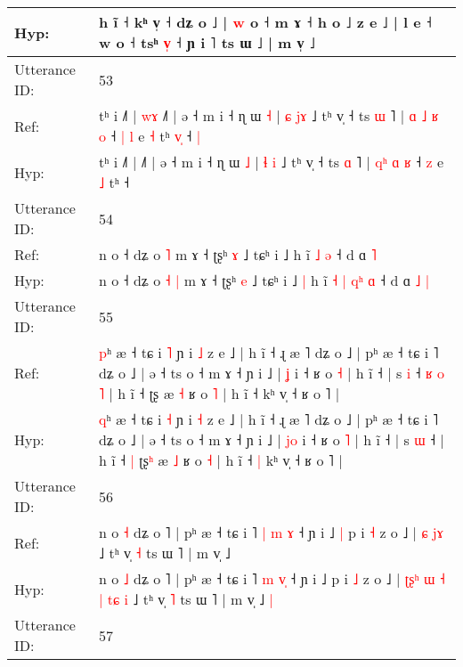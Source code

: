 \documentclass[10pt]{article}
\DeclareRobustCommand{\hl}[1]{{\textcolor{red}{#1}}}
\begin{document}
\begin{longtable}{ll}
 \\
Hyp: & h ĩ ˧ kʰ v̩ ˧ dʑ o ˩ | \hl{w} o ˧ m ɤ ˧ h o ˩ z e ˩\hl{}\hl{}\hl{}\hl{}\hl{}\hl{}\hl{}\hl{} | l e ˧ w o ˧ tsʰ \hl{v}\hl{̩} ˧ ɲ i ˥ ts ɯ ˩ | m v̩ ˩
 \\
\midrule
Utterance ID: & 53 \\
Ref: & tʰ i ˩˥ |\hl{ }\hl{w}\hl{ɤ} ˩˥ | ə ˧ m i ˧ ɳ ɯ \hl{˧} | \hl{ɕ} \hl{j}\hl{ɤ} ˩ tʰ v̩ ˧ ts \hl{ɯ} ˥ | \hl{ɑ}\hl{ }\hl{˩} \hl{ʁ} \hl{o} ˧\hl{ }\hl{|} \hl{l} e \hl{˧} tʰ\hl{ }\hl{v}\hl{̩} ˧\hl{ }\hl{|}
 \\
Hyp: & tʰ i ˩˥ |\hl{}\hl{}\hl{} ˩˥ | ə ˧ m i ˧ ɳ ɯ \hl{˩} | \hl{ɬ} \hl{}\hl{i} ˩ tʰ v̩ ˧ ts \hl{ɑ} ˥ | \hl{}\hl{q}\hl{ʰ} \hl{ɑ} \hl{ʁ} ˧\hl{}\hl{} \hl{z} e \hl{˩} tʰ\hl{}\hl{}\hl{} ˧\hl{}\hl{}
 \\
\midrule
Utterance ID: & 54 \\
Ref: & n o ˧ dʑ o\hl{}\hl{} \hl{˥} m ɤ ˧ ʈʂʰ \hl{ɤ} ˩ tɕʰ i ˩\hl{}\hl{} h ĩ\hl{}\hl{}\hl{}\hl{} \hl{}\hl{˩} \hl{ə} ˧ d ɑ\hl{}\hl{} \hl{˥}
 \\
Hyp: & n o ˧ dʑ o\hl{ }\hl{˧} \hl{|} m ɤ ˧ ʈʂʰ \hl{e} ˩ tɕʰ i ˩\hl{ }\hl{|} h ĩ\hl{ }\hl{˧}\hl{ }\hl{|} \hl{q}\hl{ʰ} \hl{ɑ} ˧ d ɑ\hl{ }\hl{˩} \hl{|}
 \\
\midrule
Utterance ID: & 55 \\
Ref: & \hl{p}ʰ æ ˧ tɕ i \hl{˥} ɲ i \hl{˩} z e ˩ | h ĩ ˧ ɻ æ ˥ dʑ o ˩ | pʰ æ ˧ tɕ i ˥ dʑ o ˩ | ə ˧ ts o ˧ m ɤ ˧ ɲ i ˩ | \hl{}\hl{ʝ} i ˧ ʁ o \hl{˧} | h ĩ ˧ | s \hl{i} ˧\hl{ }\hl{ʁ}\hl{ }\hl{o}\hl{ }\hl{˥} | h ĩ ˧\hl{}\hl{} ʈʂ\hl{} æ \hl{˧} ʁ o \hl{˥} | h ĩ ˧\hl{}\hl{} kʰ v̩ ˧ ʁ o ˥ |
 \\
Hyp: & \hl{q}ʰ æ ˧ tɕ i \hl{˧} ɲ i \hl{˧} z e ˩ | h ĩ ˧ ɻ æ ˥ dʑ o ˩ | pʰ æ ˧ tɕ i ˥ dʑ o ˩ | ə ˧ ts o ˧ m ɤ ˧ ɲ i ˩ | \hl{j}\hl{o} i ˧ ʁ o \hl{˥} | h ĩ ˧ | s \hl{ɯ} ˧\hl{}\hl{}\hl{}\hl{}\hl{}\hl{} | h ĩ ˧\hl{ }\hl{|} ʈʂ\hl{ʰ} æ \hl{˩} ʁ o \hl{˧} | h ĩ ˧\hl{ }\hl{|} kʰ v̩ ˧ ʁ o ˥ |
 \\
\midrule
Utterance ID: & 56 \\
Ref: & n o \hl{˧} dʑ o ˥ | pʰ æ ˧ tɕ i ˥ \hl{|} \hl{m}\hl{ }\hl{ɤ} ˧ ɲ i ˩\hl{ }\hl{|} p i \hl{˧} z o ˩ |\hl{}\hl{}\hl{}\hl{}\hl{}\hl{}\hl{}\hl{} \hl{ɕ} \hl{}\hl{}\hl{j}\hl{ɤ} ˩ tʰ v̩ \hl{˧} ts ɯ ˥ | m v̩ ˩\hl{}\hl{}
 \\
Hyp: & n o \hl{˩} dʑ o ˥ | pʰ æ ˧ tɕ i ˥ \hl{m} \hl{}\hl{v}\hl{̩} ˧ ɲ i ˩\hl{}\hl{} p i \hl{˩} z o ˩ |\hl{ }\hl{ʈ}\hl{ʂ}\hl{ʰ}\hl{ }\hl{ɯ}\hl{ }\hl{˧} \hl{|} \hl{t}\hl{ɕ}\hl{ }\hl{i} ˩ tʰ v̩ \hl{˥} ts ɯ ˥ | m v̩ ˩\hl{ }\hl{|}
 \\
\midrule
Utterance ID: & 57 \\

\end{longtable}
\end{document}
